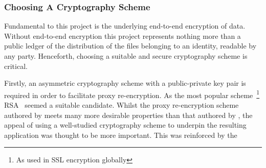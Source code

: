 \subsubsection{Choosing A Cryptography Scheme}

Fundamental to this project is the underlying end-to-end encryption of data. Without end-to-end encryption this project represents nothing more than a public ledger of the distribution of the files belonging to an identity, readable by any party. Henceforth, choosing a suitable and secure cryptography scheme is critical.

Firstly, an asymmetric cryptography scheme with a public-private key pair is required in order to facilitate proxy re-encryption. As the most popular scheme~\footnote{As used in SSL encryption globally} RSA~\cite{rsa:1978:article} seemed a suitable candidate. Whilst the proxy re-encryption scheme authored by \cite{afgh:2006:article} meets many more desirable properties than that authored by \cite{ivandodis:2003:inproceedings}, the appeal of using a well-studied cryptography scheme to underpin the resulting application was thought to be more important. This was reinforced by the 

